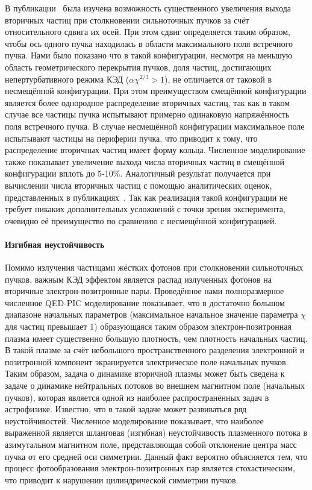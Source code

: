 В публикации~\cite{filipovic2021effect} была изучена возможность существенного увеличения выхода вторичных частиц при столкновении сильноточных пучков за счёт относительного сдвига их осей.
При этом сдвиг определяется таким образом, чтобы ось одного пучка находилась в области максимального поля встречного пучка. Нами было показано что в такой конфигурации, несмотря на меньшую область геометрического перекрытия пучков, доля частиц, достигающих непертурбативного режима КЭД ($\alpha \chi^{2/3} > 1$), не отличается от таковой в несмещённой конфигурации.
При этом преимуществом смещённой конфигурации является более однородное распределение вторичных частиц, так как в таком случае все частицы пучка испытывают примерно одинаковую напряжённость поля встречного пучка.
В случае несмещённой конфигурации максимальное поле испытывают частицы на периферии пучка, что приводит к тому, что распределение вторичных частиц имеет форму кольца.
Численное моделирование также показывает увеличение выхода числа вторичных частиц в смещённой конфигурации вплоть до 5-10\%.
Аналогичный результат получается при вычислении числа вторичных частиц с помощью аналитических оценок, представленных в публикациях~\cite{chen1989coherent, yokoya1992beam}.
Так как реализация такой конфигурации не требует никаких дополнительных усложнений с точки зрения эксперимента, очевидно её преимущество по сравнению с несмещённой конфигурацией.


\paragraph{Изгибная неустойчивость}

Помимо излучения частицами жёстких фотонов при столкновении сильноточных пучков, важным КЭД эффектом является распад излученных фотонов на вторичные электрон-позитронные пары.
Проведённое нами полноразмерное численное QED-PIC моделирование показывает, что в достаточно большом диапазоне начальных параметров (максимальное начальное значение параметра $\chi$ для частиц превышает 1) образующаяся таким образом электрон-позитронная плазма имеет существенно большую плотность, чем плотность начальных частиц.
В такой плазме за счёт небольшого пространственного разделения электронной и позитронной компонент экранируется электрическое поле начальных пучков.
Таким образом, задача о динамике вторичной плазмы может быть сведена к задаче о динамике нейтральных потоков во внешнем магнитном поле (начальных пучков), которая является одной из наиболее распространённых задач в астрофизике.
Известно, что в такой задаче может развиваться ряд неустойчивостей.
Численное моделирование показывает, что наиболее выраженной является шланговая (изгибная) неустойчивость плазменного потока в азимутальном магнитном поле, представляющая собой отклонение центра масс пучка от его средней оси симметрии.
Данный факт вероятно объясняется тем, что процесс фотообразования электрон-позитронных пар является стохастическим, что приводит к нарушении цилиндрической симметрии пучков.

